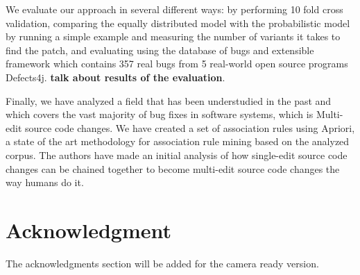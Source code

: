 \documentclass[conference]{IEEEtran}
\newcommand{\todo}[1]
  {{\scriptsize \textbf{\color{red} {#1}}}}
\begin{document}
We evaluate our approach in several different ways: by performing 10 fold cross 
validation, comparing the equally distributed model with the probabilistic model by running a 
simple example and measuring the number of variants it takes to find the patch,
and evaluating using the database of bugs and extensible 
framework which contains 357 real bugs from 5 real-world open source programs Defects4j.
\todo{talk about results of the evaluation}.

Finally, we have analyzed a field that has been understudied in the past and which covers 
the vast majority of bug fixes in software systems, which is Multi-edit source code changes. 
We have created a set of association rules using Apriori, a state of the art
methodology for association rule mining based on the analyzed corpus. The authors have
made an initial analysis of how single-edit source code changes can be chained together 
to become multi-edit source code changes the way humans do it.





\section*{Acknowledgment}
The acknowledgments section will be added for the camera ready version. 







%
%
%







\end{document}
